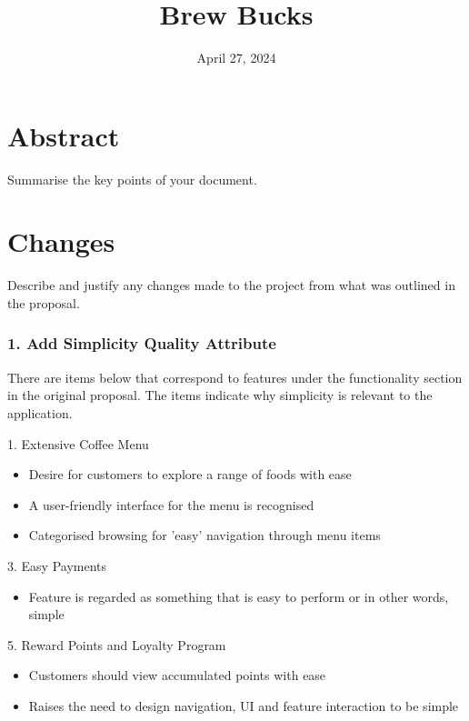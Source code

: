 \documentclass{article}
\title{Brew Bucks}
\date{April 27, 2024}
\begin{document}
\maketitle
\pagebreak

\tableofcontents
\pagebreak

\section{Abstract}
Summarise the key points of your document.
\section{Changes}
Describe and justify any changes made to the project from what was outlined in the proposal.

\subsubsection*{1. Add Simplicity Quality Attribute}
There are items below that correspond to features under the functionality section in the original proposal. The items indicate why simplicity is relevant to the application.

\bigskip \hfill \begin{minipage}{\dimexpr\textwidth-0.5cm}
1. Extensive Coffee Menu 
\begin{itemize}
    \item Desire for customers to explore a range of foods with ease
    \item A user-friendly interface for the menu is recognised
    \item Categorised browsing for 'easy' navigation through menu items
\end{itemize}

3. Easy Payments
\begin{itemize}
    \item Feature is regarded as something that is easy to perform or in other words, simple
\end{itemize}

5. Reward Points and Loyalty Program
\begin{itemize}
    \item Customers should view accumulated points with ease
    \item Raises the need to design navigation, UI and feature interaction to be simple
\end{itemize}
\end{minipage}
\end{document}
